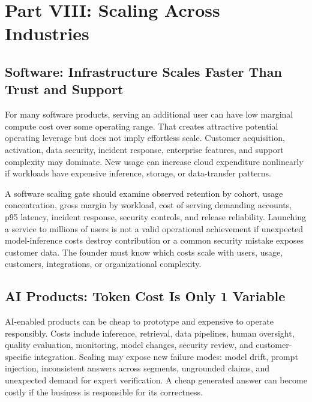 \section*{Part VIII: Scaling Across Industries}
\label{sec:part8_scaling_across_industries}

\subsection{Software: Infrastructure Scales Faster Than Trust and Support}
\label{sec:software_infrastructure_vs_trust}

For many software products, serving an additional user can have low marginal compute cost over some operating range. That creates attractive potential operating leverage but does not imply effortless scale. Customer acquisition, activation, data security, incident response, enterprise features, and support complexity may dominate. New usage can increase cloud expenditure nonlinearly if workloads have expensive inference, storage, or data-transfer patterns.

A software scaling gate should examine observed retention by cohort, usage concentration, gross margin by workload, cost of serving demanding accounts, p95 latency, incident response, security controls, and release reliability. Launching a service to millions of users is not a valid operational achievement if unexpected model-inference costs destroy contribution or a common security mistake exposes customer data. The founder must know which costs scale with users, usage, customers, integrations, or organizational complexity.

\subsection{AI Products: Token Cost Is Only 1 Variable}
\label{sec:ai_products_token_cost}

AI-enabled products can be cheap to prototype and expensive to operate responsibly. Costs include inference, retrieval, data pipelines, human oversight, quality evaluation, monitoring, model changes, security review, and customer-specific integration. Scaling may expose new failure modes: model drift, prompt injection, inconsistent answers across segments, ungrounded claims, and unexpected demand for expert verification. A cheap generated answer can become costly if the business is responsible for its correctness.

